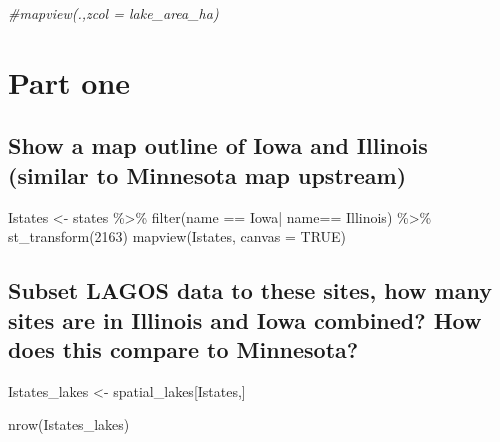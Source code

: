 \documentclass[
]{book}
\newenvironment{Shaded}{\begin{snugshade}}{\end{snugshade}}
\newcommand{\AttributeTok}[1]{\textcolor[rgb]{0.77,0.63,0.00}{#1}}
\newcommand{\CommentTok}[1]{\textcolor[rgb]{0.56,0.35,0.01}{\textit{#1}}}
\newcommand{\ConstantTok}[1]{\textcolor[rgb]{0.00,0.00,0.00}{#1}}
\newcommand{\DecValTok}[1]{\textcolor[rgb]{0.00,0.00,0.81}{#1}}
\newcommand{\FunctionTok}[1]{\textcolor[rgb]{0.00,0.00,0.00}{#1}}
\newcommand{\NormalTok}[1]{#1}
\newcommand{\OtherTok}[1]{\textcolor[rgb]{0.56,0.35,0.01}{#1}}
\newcommand{\SpecialCharTok}[1]{\textcolor[rgb]{0.00,0.00,0.00}{#1}}
\newcommand{\StringTok}[1]{\textcolor[rgb]{0.31,0.60,0.02}{#1}}
\begin{document}
\begin{Shaded}
\begin{Highlighting}[]
  \CommentTok{\#mapview(.,zcol = \textquotesingle{}lake\_area\_ha\textquotesingle{})}
\end{Highlighting}
\end{Shaded}

\hypertarget{part-one}{%
\section{Part one}\label{part-one}}

\hypertarget{show-a-map-outline-of-iowa-and-illinois-similar-to-minnesota-map-upstream}{%
\subsection{Show a map outline of Iowa and Illinois (similar to Minnesota map upstream)}\label{show-a-map-outline-of-iowa-and-illinois-similar-to-minnesota-map-upstream}}

\begin{Shaded}
\begin{Highlighting}[]
\NormalTok{Istates }\OtherTok{\textless{}{-}}\NormalTok{ states }\SpecialCharTok{\%\textgreater{}\%}
  \FunctionTok{filter}\NormalTok{(name }\SpecialCharTok{==} \StringTok{\textquotesingle{}Iowa\textquotesingle{}}\SpecialCharTok{|}\NormalTok{ name}\SpecialCharTok{==} \StringTok{\textquotesingle{}Illinois\textquotesingle{}}\NormalTok{) }\SpecialCharTok{\%\textgreater{}\%}
  \FunctionTok{st\_transform}\NormalTok{(}\DecValTok{2163}\NormalTok{)}
\FunctionTok{mapview}\NormalTok{(Istates, }\AttributeTok{canvas =} \ConstantTok{TRUE}\NormalTok{) }
\end{Highlighting}
\end{Shaded}

\hypertarget{subset-lagos-data-to-these-sites-how-many-sites-are-in-illinois-and-iowa-combined-how-does-this-compare-to-minnesota}{%
\subsection{Subset LAGOS data to these sites, how many sites are in Illinois and Iowa combined? How does this compare to Minnesota?}\label{subset-lagos-data-to-these-sites-how-many-sites-are-in-illinois-and-iowa-combined-how-does-this-compare-to-minnesota}}

\begin{Shaded}
\begin{Highlighting}[]
\NormalTok{Istates\_lakes }\OtherTok{\textless{}{-}}\NormalTok{ spatial\_lakes[Istates,]}

\FunctionTok{nrow}\NormalTok{(Istates\_lakes)}
\end{Highlighting}
\end{Shaded}
\end{document}
